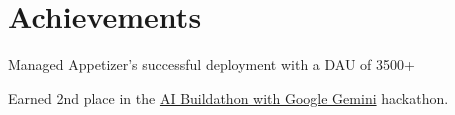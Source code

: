 \documentclass[letterpaper]{deedy-resume} %
\begin{document}
\begin{minipage}[t]{0.66\textwidth}
\sectionspace %





\section{Achievements} 
\begin{tightitemize}
\sectionspace %
\item Managed Appetizer's successful deployment with a DAU of 3500+
\item Earned 2nd place in the \href{https://www.linkedin.com/feed/update/urn:li:activity:7202265494651822080/}{AI Buildathon with Google Gemini} hackathon.


\end{tightitemize}



\end{minipage} %
\end{document}
